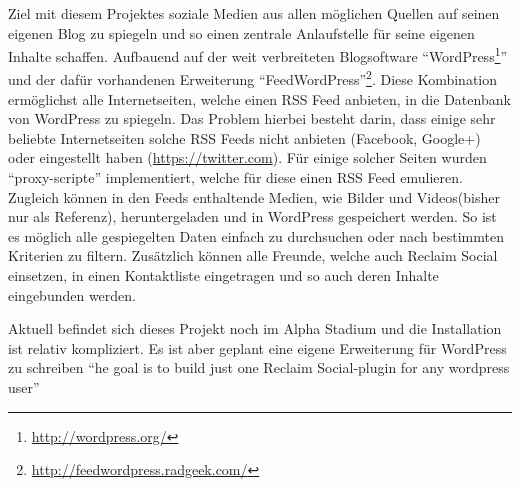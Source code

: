 
\medskip

Ziel mit diesem Projektes soziale Medien aus allen möglichen Quellen auf seinen eigenen Blog zu spiegeln und so einen zentrale Anlaufstelle für seine eigenen Inhalte schaffen. Aufbauend auf der weit verbreiteten Blogsoftware \enquote{WordPress\footnote{\url{http://wordpress.org/}}} und der dafür vorhandenen Erweiterung \enquote{FeedWordPress}\footnote{\url{http://feedwordpress.radgeek.com/}}. Diese Kombination ermöglichst alle Internetseiten, welche einen RSS Feed anbieten, in die Datenbank von WordPress zu spiegeln. Das Problem hierbei besteht darin, dass einige sehr beliebte Internetseiten solche RSS Feeds nicht anbieten (Facebook, Google+) oder eingestellt haben (\url{https://twitter.com}). Für einige solcher Seiten wurden \enquote{proxy-scripte}\cite[Tech Specs Details]{Schwenzel2013} implementiert, welche für diese einen RSS Feed emulieren. Zugleich können in den Feeds enthaltende Medien, wie Bilder und Videos(bisher nur als Referenz), heruntergeladen und in WordPress gespeichert werden. So ist es möglich alle gespiegelten Daten einfach zu durchsuchen oder nach bestimmten Kriterien zu filtern. Zusätzlich können alle Freunde, welche auch Reclaim Social einsetzen, in einen Kontaktliste eingetragen und so auch deren Inhalte eingebunden werden.

\medskip

Aktuell befindet sich dieses Projekt noch im Alpha Stadium und die Installation ist relativ kompliziert. Es ist aber geplant eine eigene Erweiterung für WordPress zu schreiben \enquote{he goal is to build just one Reclaim Social-plugin for any wordpress user}\cite[How Does It Work]{Schwenzel2013}



